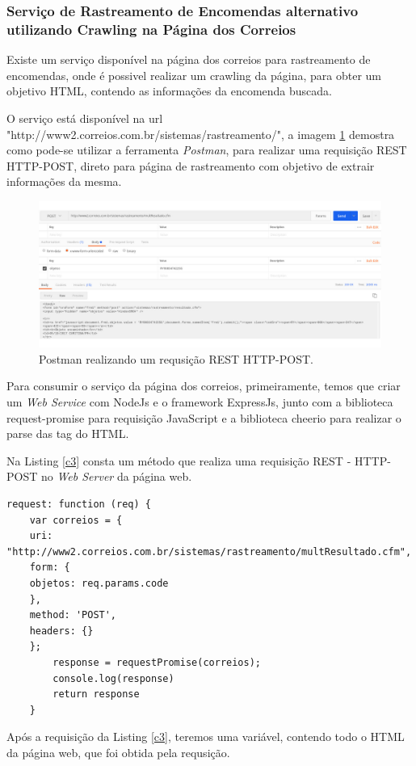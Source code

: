 \documentclass[12pt]{article}
\begin{document}
\subsubsection{Serviço de Rastreamento de Encomendas alternativo utilizando Crawling na Página dos Correios}

	Existe um serviço disponível na página dos correios para rastreamento de encomendas, onde é possivel realizar um crawling da página, para obter um objetivo HTML, contendo as informações da encomenda buscada.
	
	O serviço está disponível na url "http://www2.correios.com.br/sistemas/rastreamento/", a imagem \ref{c1} demostra como pode-se utilizar a ferramenta \textit{Postman}, para realizar uma requisição REST HTTP-POST, direto para página de rastreamento com objetivo de extrair informações da mesma.
	
	 \begin{figure}[H]
	 	\centering
	 	\includegraphics[scale=0.3]{Imagens/c1.jpg}
	 	\caption{Postman realizando um requsição REST HTTP-POST.}
	 	\label{c1}
	 \end{figure}
	
	Para consumir o serviço da página dos correios, primeiramente, temos que criar um \textit{Web Service} com NodeJs e o framework ExpressJs, junto com a biblioteca request-promise para requisição JavaScript e a biblioteca cheerio para realizar o parse das tag do HTML.
	
	Na Listing \ref{c3} consta um método que realiza uma requisição REST - HTTP-POST no \textit{Web Server} da página web.
	
	\medskip
	\begin{lstlisting}[caption=Criando Requisição em Java Script,label=c3]
	request: function (req) {
	var correios = {
	uri: "http://www2.correios.com.br/sistemas/rastreamento/multResultado.cfm",
	form: {
	objetos: req.params.code
	},
	method: 'POST',
	headers: {}
	};
		response = requestPromise(correios);
		console.log(response)
		return response
	}	
	\end{lstlisting}
	Após a requisição da Listing \ref{c3}, teremos uma variável, contendo todo o HTML da página web, que foi obtida pela requsição.
	
\end{document}
